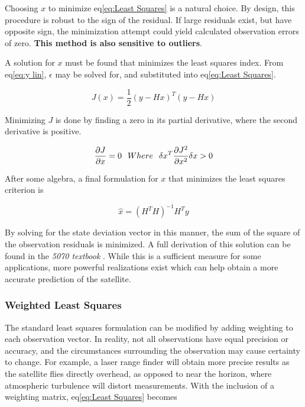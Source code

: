 \documentclass[12pt,a4paper,oneside]{article}
\numberwithin{equation}{section}   		%
\newcommand{\bad}[1]{\color{red}\textbf{#1}\color{black}}
\begin{document}
Choosing $x$ to minimize eq\eqref{eq:Least Squares} is a natural choice. By design, this procedure is robust to the sign of the residual. If large residuals exist, but have opposite sign, the minimization attempt could yield calculated observation errors of zero. \bad{This method is also sensitive to outliers}.

A solution for $x$ must be found that minimizes the least squares index. From eq\eqref{eq:y lin}, $\epsilon$ may be solved for, and substituted into eq\eqref{eq:Least Squares}. 

\begin{equation}
	J(x) = \frac{1}{2}(y-Hx)^T (y-Hx)
	\label{eq:Min Least Squares}
\end{equation}

Minimizing $J$ is done by finding a zero in its partial derivative, where the second derivative is positive. 

\begin{displaymath}
	\frac{\partial{J}}{\partial{x}} = 0 
	\hspace{0.25cm} Where \hspace{0.25cm}
	\delta{x}^T\frac{\partial{J}^2}{\partial{x}^2} \delta{x}> 0 
\end{displaymath}

After some algebra, a final formulation for $x$ that minimizes the least squares criterion is

\begin{equation}
	\hat{x} = (H^T H)^{-1} H^T y
	\label{eq:x Least Squares}
\end{equation}

By solving for the state deviation vector in this manner, the sum of the square of the observation residuals is minimized. A full derivation of this solution can be found in the \emph{5070 textbook} \cite{tapley2004statistical}. While this is a sufficient measure for some applications, more powerful realizations exist which can help obtain a more accurate prediction of the satellite. 


\subsubsection{Weighted Least Squares}
\label{OD sub WLS}
The standard least squares formulation can be modified by adding weighting to each observation vector. In reality, not all observations have equal precision or accuracy, and the circumstances surrounding the observation may cause certainty to change. For example, a laser range finder will obtain more precise results as the satellite flies directly overhead, as opposed to near the horizon, where atmospheric turbulence will distort measurements. With the inclusion of a weighting matrix, eq\eqref{eq:Least Squares} becomes
\end{document}
